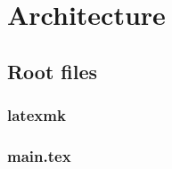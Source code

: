     
    

\newpage
\section{Architecture}
\label{sec:tutorial/architecture}


    \subsection{Root files}
    \label{sec:tutorial/architecture/root}
    
    
        \subsubsection*{\thesubsubsection\hspace{1em}latexmk}
        \label{sec:tutorial/architecture/root/latexmkrc}
        
    
        \subsubsection{main.tex}
        \label{sec:tutorial/architecture/root/main}
        
        
